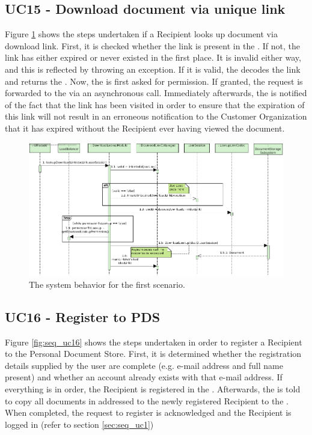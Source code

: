 \subsection{UC15 - Download document via unique link}
Figure \ref{fig:seq_uc15} shows the steps undertaken if a Recipient looks up document via download link. First, it is checked whether the link is present in the . If not, the link has either expired or never existed in the first place. It is invalid either way, and this is reflected by throwing an exception. If it is valid, the  decodes the link and returns the . Now, the  is first asked for permission. If granted, the request is forwarded to the  via an asynchronous call. Immediately afterwards, the  is notified of the fact that the link has been visited in order to ensure that the expiration of this link will not result in an erroneous notification to the Customer Organization that it has expired without the Recipient ever having viewed the document.

\begin{figure}[!htp]
    \centering
    \includegraphics[width=\textwidth]{figures/UC15 - Download document via unique link.png}
    \caption{The system behavior for the first scenario.
        }\label{fig:seq_uc15}
\end{figure}

\subsection{UC16 - Register to PDS}
Figure \ref{fig:seq_uc16} shows the steps undertaken in order to register a Recipient to the Personal Document Store. First, it is determined whether the registration details supplied by the user are complete (e.g. e-mail address and full name present) and whether an account already exists with that e-mail address. If everything is in order, the Recipient is registered in the . Afterwards, the  is told to copy all documents in  addressed to the newly registered Recipient to the . When completed, the request to register is acknowledged and the Recipient is logged in (refer to section \ref{sec:seq_uc1})

